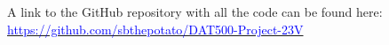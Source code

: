 
A link to the GitHub repository with all the code can be found here: \href{https://github.com/sbthepotato/DAT500-Project-23V}{\textcolor{blue}{https://github.com/sbthepotato/DAT500-Project-23V}} \cite{projectgithub}
